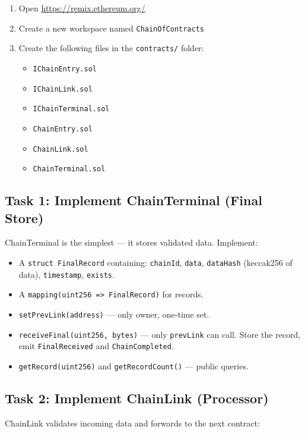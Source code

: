 \documentclass[11pt,a4paper]{article}
\begin{document}
\begin{enumerate}
    \item Open \url{https://remix.ethereum.org/}
    \item Create a new workspace named \texttt{ChainOfContracts}
    \item Create the following files in the \texttt{contracts/} folder:
    \begin{itemize}
        \item \texttt{IChainEntry.sol}
        \item \texttt{IChainLink.sol}
        \item \texttt{IChainTerminal.sol}
        \item \texttt{ChainEntry.sol}
        \item \texttt{ChainLink.sol}
        \item \texttt{ChainTerminal.sol}
    \end{itemize}
\end{enumerate}

\subsection{Task 1: Implement ChainTerminal (Final Store)}

ChainTerminal is the simplest --- it stores validated data. Implement:

\begin{itemize}
    \item A \texttt{struct FinalRecord} containing: \texttt{chainId}, \texttt{data},
          \texttt{dataHash} (keccak256 of data), \texttt{timestamp}, \texttt{exists}.
    \item A \texttt{mapping(uint256 => FinalRecord)} for records.
    \item \texttt{setPrevLink(address)} --- only owner, one-time set.
    \item \texttt{receiveFinal(uint256, bytes)} --- only \texttt{prevLink} can call.
          Store the record, emit \texttt{FinalReceived} and \texttt{ChainCompleted}.
    \item \texttt{getRecord(uint256)} and \texttt{getRecordCount()} --- public queries.
\end{itemize}

\subsection{Task 2: Implement ChainLink (Processor)}

ChainLink validates incoming data and forwards to the next contract:
\end{document}
